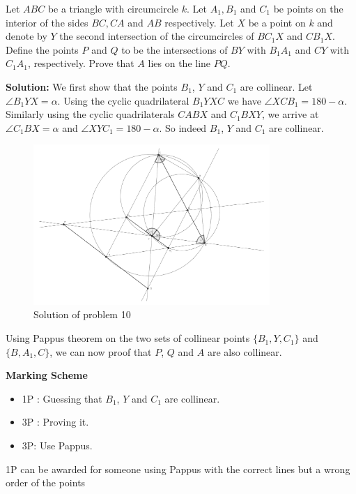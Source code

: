 Let $ABC$ be a triangle with circumcircle $k$. Let $A_1,B_1$ and $C_1$ be points on the interior of the sides $BC,CA$ and $AB$ respectively. Let $X$ be a point on $k$ and denote by $Y$ the second intersection of the circumcircles of $BC_1X$ and $CB_1X$. Define the points $P$ and $Q$ to be the intersections of $BY$ with $B_1A_1$ and $CY$ with $C_1A_1$, respectively. Prove that $A$ lies on the line $PQ$.

\textbf{Solution:} We first show that the points $B_1$, $Y$ and $C_1$ are collinear. Let $\angle B_1 Y X = \alpha$. Using the cyclic quadrilateral $B_1YXC$ we have $\angle X C B_1 = 180- \alpha$. Similarly using the cyclic quadrilaterals $CABX$ and $C_1BXY$, we arrive at $\angle C_1 B X = \alpha$ and $\angle XY C_1 = 180- \alpha$. So indeed $B_1$, $Y$ and $C_1$ are collinear. 

\begin{figure}[h!]
    \centering
    \includegraphics[width = 0.8\textwidth]{solutions/s10_solpic.pdf}
    \caption{Solution of problem 10}
\end{figure}

 Using Pappus theorem on the two sets of collinear points $\{B_1, Y, C_1\}$ and $\{B, A_1, C\}$, we can now proof that $P$, $Q$ and $A$ are also collinear. 


\textbf{Marking Scheme}
\begin{itemize}
    \item 1P : Guessing that $B_1$, $Y$ and $C_1$ are collinear.
    \item 3P : Proving it.
    \item 3P:  Use Pappus.
\end{itemize}

1P can be awarded for someone using Pappus with the correct lines but a wrong order of the points
